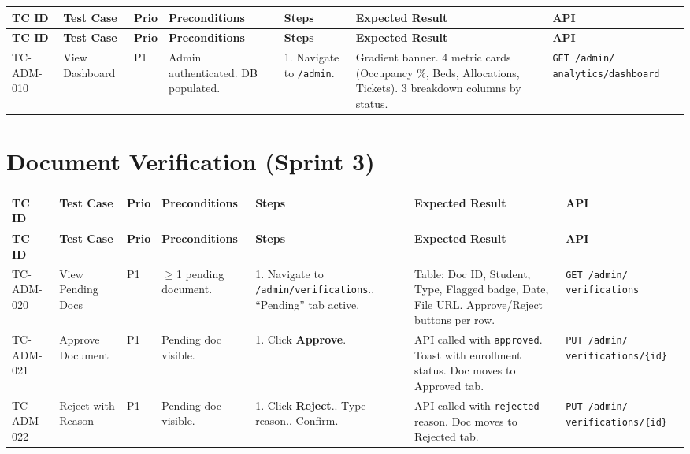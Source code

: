 \documentclass[12pt,a4paper]{article}
\begin{document}
\begin{longtable}{L{2cm} L{3cm} L{1cm} L{4cm} L{5.5cm} L{5.5cm} L{3cm}}
\toprule
\textbf{TC ID} & \textbf{Test Case} & \textbf{Prio} & \textbf{Preconditions} & \textbf{Steps} & \textbf{Expected Result} & \textbf{API} \\
\midrule
\endfirsthead \toprule \textbf{TC ID} & \textbf{Test Case} & \textbf{Prio} & \textbf{Preconditions} & \textbf{Steps} & \textbf{Expected Result} & \textbf{API} \\ \midrule \endhead \bottomrule \endfoot

TC-ADM-010 & View Dashboard & P1 & Admin authenticated. DB populated. & 1. Navigate to \texttt{/admin}. & Gradient banner. 4 metric cards (Occupancy \%, Beds, Allocations, Tickets). 3 breakdown columns by status. & \texttt{GET /admin/ analytics/dashboard} \\
\end{longtable}

\section{Document Verification (Sprint 3)}

\begin{longtable}{L{2cm} L{3cm} L{1cm} L{4cm} L{5.5cm} L{5.5cm} L{3cm}}
\toprule
\textbf{TC ID} & \textbf{Test Case} & \textbf{Prio} & \textbf{Preconditions} & \textbf{Steps} & \textbf{Expected Result} & \textbf{API} \\
\midrule
\endfirsthead \toprule \textbf{TC ID} & \textbf{Test Case} & \textbf{Prio} & \textbf{Preconditions} & \textbf{Steps} & \textbf{Expected Result} & \textbf{API} \\ \midrule \endhead \bottomrule \endfoot

TC-ADM-020 & View Pending Docs & P1 & $\geq$1 pending document. & 1. Navigate to \texttt{/admin/verifications}.. ``Pending'' tab active. & Table: Doc ID, Student, Type, Flagged badge, Date, File URL. Approve/Reject buttons per row. & \texttt{GET /admin/ verifications} \\
\midrule
TC-ADM-021 & Approve Document & P1 & Pending doc visible. & 1. Click \textbf{Approve}. & API called with \texttt{approved}. Toast with enrollment status. Doc moves to Approved tab. & \texttt{PUT /admin/ verifications/\{id\}} \\
\midrule
TC-ADM-022 & Reject with Reason & P1 & Pending doc visible. & 1. Click \textbf{Reject}.. Type reason.. Confirm. & API called with \texttt{rejected} + reason. Doc moves to Rejected tab. & \texttt{PUT /admin/ verifications/\{id\}} \\
\end{longtable}
\end{document}
